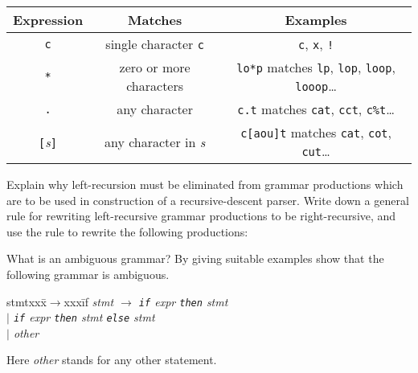 \begin{questions}
\begin{subquestions}
\begin{center}
\begin{tabular}{|c|c|c|}        \hline
Expression & Matches & Examples \\ \hline
\verb"c"                & single character \verb"c"      & \verb"c", \verb"x", \verb"!"\\                     
\verb"*"                & zero or more characters        & \verb"lo*p" matches \verb"lp", \verb"lop", \verb"loop", \verb"looop"\ldots\\
\verb"."                & any character                  & \verb"c.t" matches \verb"cat", \verb"cct", \verb"c%t"\ldots\\
\verb"["{\it s\/}\verb"]" & any character in {\it s}     & \verb"c[aou]t"  matches \verb"cat", \verb"cot", \verb"cut"\ldots\\
 \hline
\end{tabular}
\end{center}

\vspace{0.1in}

\subquestion
        Explain why left-recursion must be eliminated from
        grammar productions which are to be used in
        construction of a recursive-descent parser.
        Write down a general rule for rewriting left-recursive
        grammar productions to be right-recursive, and use the rule
        to rewrite the following productions:
\begin{bnf}
\end{bnf}

\subquestion
What is an ambiguous grammar? By giving suitable examples show that the
        following grammar is ambiguous. 
\begin{tabbing}
stmtxxx\=$\rightarrow$xxx\=if\kill
\it
stmt \> $\rightarrow$ \> \verb"if" {\it expr\/} \verb"then" {\it stmt} \\
\it
     \> $\mid$ \> \verb"if" {\it expr\/} \verb"then" {\it stmt\/} \verb"else" {\it stmt} \\
     \> $\mid$ \> {\it other}
\end{tabbing}
Here {\it other\/} stands for any other statement.


\end{subquestions}


\question



\end{questions}
